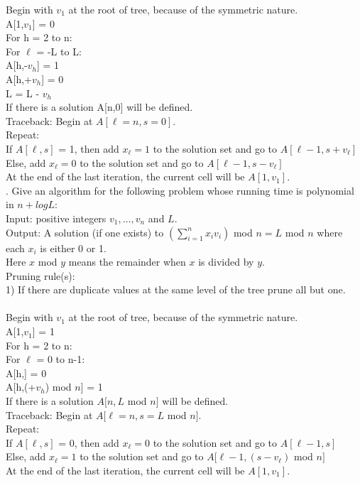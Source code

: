 \documentclass[10pt]{article}
\newcommand{\tab}{\hspace*{2em}}
\newcommand{\tabb}{\hspace*{4em}}
\begin{document}
			Begin with $v_1$ at the root of tree, because of the symmetric nature.\\
			A[1,$v_1$] = 0\\
			
		 	For h = 2 to n:\\
			\tab For $\ell$ = -L to L:\\
			\tabb A[h,\ell-$v_h$] = 1\\
			\tabb A[h,\ell+$v_h$] = 0\\
			\tabb L = L - $v_h$\\
			
			If there is a solution A[n,0] will be defined.\\
			Traceback: Begin at $A[\ell=n, s=0]$.\\
			Repeat:\\
				\tab If $A[\ell,s]$ = 1, then add $x_{\ell} = 1$ to the solution set and go to $A[\ell-1,s+v_{\ell}]$\\
				\tab Else, add $x_{\ell} = 0$ to the solution set and go to $A[\ell-1,s-v_{\ell}]$\\
			At the end of the last iteration, the current cell will be $A[1,v_1]$.\\
	
	.	Give an algorithm for the following problem whose running time is polynomial in $n + log L$:\\
			Input: positive integers $v_1, \ldots , v_n$ and $L$.\\
			Output:  A solution (if one exists) to $(\sum_{i=1}^n x_i v_i)$ mod $n = L$ mod $n$ where each $x_i$ is either 0 or 1.\\
			Here $x$ mod $y$ means the remainder when $x$ is divided by $y$.\\
			Pruning rule(s):\\
			1) If there are duplicate values at the same level of the tree prune all but one.\\
			\\
			
			Begin with $v_1$ at the root of tree, because of the symmetric nature.\\
			A[1,$v_1$] = 1\\
			
		 	For h = 2 to n:\\
			\tab For $\ell$ = 0 to n-1:\\
			\tabb A[h,\ell] = 0\\
			\tabb A[h,(\ell+$v_h$) mod $n$] = 1\\
			
			If there is a solution $A[n,L$ mod $n]$ will be defined.\\
			Traceback: Begin at $A[\ell=n, s=L$ mod $n]$.\\
			Repeat:\\
				\tab If $A[\ell,s]$ = 0, then add $x_{\ell} = 0$ to the solution set and go to $A[\ell-1,s]$\\
				\tab Else, add $x_{\ell} = 1$ to the solution set and go to $A[\ell-1,(s-v_{\ell})$ mod $ n]$\\
			At the end of the last iteration, the current cell will be $A[1,v_1]$.\\	
\end{document}
